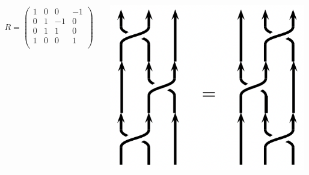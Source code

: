 \documentclass[20pt,,margin=1in,innermargin=-4.5in,blockverticalspace=-0.25in]{tikzposter}
\begin{document}
\begin{columns}
{\begin{gather*}
            R = \begin{pmatrix}
                1&0&0&-1\\
                0&1&-1&0\\
                0&1&1&0\\
                1&0&0&1\\
            \end{pmatrix}
        \end{gather*}
        \begin{tikzfigure}
            \includegraphics{Images/YangBaxterEquation.png}
        \end{tikzfigure}
        
}
\end{columns}
\end{document}
